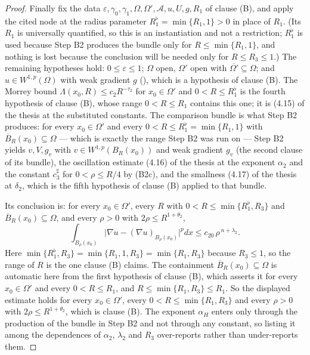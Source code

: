 \begin{proof}
Finally fix the data $\varepsilon,\gamma_0,\gamma_1,\Omega,\Omega',\mathcal
A,u,U,g,R_1$ of clause (B), and apply the cited node at the radius parameter
$R_1^{\flat}=\min\{R_1,1\}>0$ in place of $R_1$.  (Its $R_1$ is universally
quantified, so this is an instantiation and not a restriction; $R_1^{\flat}$ is
used because Step B2 produces the bundle only for $R\le\min\{R_1,1\}$, and
nothing is lost because the conclusion will be needed only for
$R\le R_3\le1$.)  The remaining hypotheses hold: $0\le\varepsilon\le1$;
$\Omega$ open, $\Omega'$ open with $\overline{\Omega'}\subseteq\Omega$; and
$u\in W^{1,p}(\Omega)$ with weak gradient $g$ (), which is a
hypothesis of clause (B).  The Morrey bound $\Lambda(x_0,R)\le c_2R^{-\tau_2}$
for $x_0\in\Omega'$ and $0<R\le R_1^{\flat}$ is the fourth hypothesis of clause
(B), whose range $0<R\le R_1$ contains this one; it is (4.15) of the thesis at the
substituted constants.  The comparison bundle is what Step B2 produces: for
every $x_0\in\Omega'$ and every $0<R\le R_1^{\flat}=\min\{R_1,1\}$ with
$\overline B_R(x_0)\subseteq\Omega$ --- which is exactly the range Step B2 was
run on --- Step B2 yields $v,V,g_v$ with $v\in W^{1,p}(B_R(x_0))$ and weak
gradient $g_v$ (the second clause of its bundle), the oscillation estimate
(4.16) of the thesis at the exponent $\alpha_2$ and the constant $c_3^{\sharp}$ for
$0<\rho\le R/4$ by (B2c), and the smallness (4.17) of the thesis at $\delta_2$,
which is the fifth hypothesis of clause (B) applied to that bundle.

Its conclusion is: for every $x_0\in\Omega'$, every $R$ with
$0<R\le\min\{R_1^{\flat},R_3\}$ and $\overline B_R(x_0)\subseteq\Omega$, and
every $\rho>0$ with $2\rho\le R^{1+\theta_2}$,
\[
\int_{B_\rho(x_0)}\bigl|\nabla u-(\nabla u)_{B_\rho(x_0)}\bigr|^p dx
\le c_{20}\,\rho^{\,n+\lambda_2}.
\]
Here $\min\{R_1^{\flat},R_3\}=\min\{R_1,1,R_3\}=\min\{R_1,R_3\}$ because
$R_3\le1$, so the range of $R$ is the one clause (B) claims.
The containment $\overline B_R(x_0)\subseteq\Omega$ is automatic here from the
first hypothesis of clause (B), which asserts it for every $x_0\in\Omega'$ and
every $0<R\le R_1$, and $R\le\min\{R_1,R_3\}\le R_1$.  So the displayed estimate
holds for every $x_0\in\Omega'$, every $0<R\le\min\{R_1,R_3\}$ and every
$\rho>0$ with $2\rho\le R^{1+\theta_2}$, which is clause (B).  The exponent
$\alpha_H$ enters only through the production of the bundle in Step B2 and not
through any constant, so listing it among the dependences of $\alpha_2$,
$\lambda_2$ and $R_3$ over-reports rather than under-reports them.
\end{proof}
